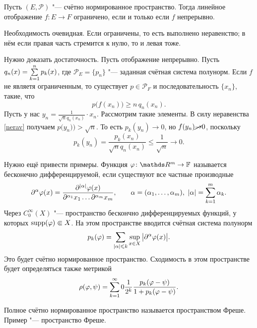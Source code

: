 \begin{The}
  Пусть $(E,\mathcal P)$ "--- счётно нормированное пространство.  Тогда линейное отображение $f\colon E\to F$ ограничено, если и только если $f$ непрерывно.
\end{The}
\begin{Proof}
  Необходимость очевидная. Если ограничены, то есть выполнено неравенство; в нём если правая часть стремится к нулю, то и левая тоже.

Нужно доказать достаточность.  Пусть отображение непрерывно. Пусть $q_n(x) = \RY k1n p_k(x)$, где $\mathcal P_E = \{p_n\}$ "--- заданная счётная система полунорм. Если $f$ не являетя ограниченным, то существует $p\in\mathcal P_F$ и последовательность $\{x_n\}$, такие, что 
\begin{equation}\label{nerav}
p\big(f(x_n)\big)\ge n\,q_n(x_n).
\end{equation}
Пусть у нас $y_n=\frac1{\sqrt nq_n(x_n)}\cdot x_n$. Рассмотрим такие элементы. В силу неравенства \eqref{nerav} получаем $p\big(y_n)\big)>\sqrt n$. То есть $p_k(y_n)\to0$, но $f(y_n)\cancel{\to}0$, поскольку
\[
  p_k(y_n) = \frac{p_k(x_n)}{\sqrt{n} q_n(x_n)}\le \frac1{\sqrt{n}}\to0.
\]
\end{Proof}

Нужно ещё привести примеры. Функция $\phi\colon \R^m\to\F$ называется бесконечно дифференцируемой, если существуют все частные производные
\[
  \dl^\alpha\phi(x) = \frac{\dl^{|\alpha|}\phi(x)}{\dl^{\alpha_1}x_1\dots\dl^{\alpha_m}x_m},\qquad \alpha = (\alpha_1,\dots,\alpha_m),\ |\alpha| = \RY k1m\alpha_k.
\]
Через $C_0^\infty(X)$ "--- пространство бескончно дифференцируемых функций, у которых $\supp(\phi)\Subset X$. На этом пространстве вводится счётная система полунорм
\[
  p_k(\phi) = \sum\limits_{|\alpha|\le k}
  \sup\limits_{x\in X} \big|\dl^{\alpha}\phi(x)\big|.
\]
Это будет счётно нормированное пространство. Сходимость в этом пространстве будет определяться также метрикой
\[
  \rho(\phi,\psi) = 
  \rY k0\frac1{2^k}\frac{p_k(\phi-\psi)}{ 1 + p_k(\phi-\psi)}.
\]

Полное счётно нормированное пространство называется пространством Фреше. Пример "--- пространство Фреше.
